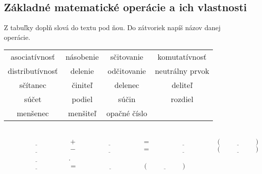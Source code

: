 \documentclass[12pt]{article}
\begin{document}
	\subsection{Základné matematické operácie a ich vlastnosti}
	Z tabuľky doplň slová do textu pod ňou. Do zátvoriek napíš názov danej operácie.\\
	\begin{table}[!hbt]
		\centering
		\begin{tabular}{|cccc|}
			\hline
			asociatívnosť& násobenie& sčitovanie& komutatívnosť \\
			
			distributívnosť& delenie& odčitovanie& neutrálny prvok\\
			
			sčítanec& činiteľ& delenec& deliteľ\\
			
			súčet& podiel& súčin& rozdiel\\
			
			menšenec& menšiteľ& opačné číslo& \\
			
			\hline
		\end{tabular}
		
	\end{table}
	\\
	$\underline{\hspace{4cm}} + \underline{\hspace{4cm}} = \underline{\hspace{4cm}} (\underline{\hspace{2cm}})$\\
	
	$\underline{\hspace{4cm}} - \underline{\hspace{4cm}} = \underline{\hspace{4cm}}  (\underline{\hspace{2cm}})$\\
	
	$\underline{\hspace{4cm}} $.$ \underline{\hspace{4cm}} = \underline{\hspace{4cm}}  (\underline{\hspace{2cm}})$\\
	
\end{document}
